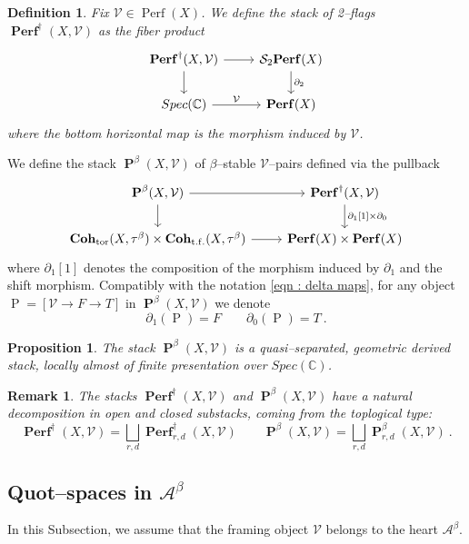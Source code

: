 \documentclass[11pt]{article}
\newtheorem{definition}{Definition}
\newtheorem{proposition}[theorem]{Proposition}
\newtheorem{remark}[theorem]{Remark}
\newcommand{\BC}{\mathbb{C}}
\newcommand{\segal}{\mathcal{S}}
\newcommand{\abeta}{\mathcal{A}^{\beta}}
\newcommand{\abetatorstack}{\boldsymbol{\operatorname{Coh}}_{\operatorname{tor}}(X,\tau^{\beta})}
\newcommand{\abetatfstack}{\boldsymbol{\operatorname{Coh}}_{\operatorname{t.f.}}(X,\tau^{\beta})}
\newcommand{\perf}{\operatorname{Perf}(X)}
\newcommand{\perfstack}{\boldsymbol{\operatorname{Perf}}(X)}
\newcommand{\framing}{\mathcal{V}}
\newcommand{\pairs}{\boldsymbol{\operatorname{P}}^{\beta}(X,\mathcal{V})}
\newcommand{\flags}{\boldsymbol{\operatorname{Perf}}^{\dagger}(X,\mathcal{V})}
\begin{document}
\begin{definition}\label{def : perf}
    Fix $\framing \in \perf$. We define the\textit{ stack of 2--flags} $\flags$ as the fiber product
    \[\begin{tikzcd}
	\flags & {\segal_2\perfstack} \\
	{Spec(\BC)} & \perfstack
	\arrow[from=1-1, to=1-2]
	\arrow[from=1-1, to=2-1]
	\arrow["{\partial_2}", from=1-2, to=2-2]
	\arrow["\framing", from=2-1, to=2-2]
\end{tikzcd}\]
where the bottom horizontal map is the morphism induced by $\framing$. 
\end{definition}
\noindent We define the stack $\pairs$ of $\beta$--stable $\framing$--pairs defined via the pullback
  \begin{equation}\label{eqn : def of stack of stable pairs}\begin{tikzcd}
	\pairs & \flags \\
	{\abetatorstack \times \abetatfstack} & {\perfstack \times \perfstack}
	\arrow[from=1-1, to=1-2]
	\arrow[from=1-1, to=2-1]
	\arrow["{\partial_1[1]\times\partial_0}", from=1-2, to=2-2]
	\arrow[from=2-1, to=2-2]
\end{tikzcd}\end{equation}
  where $\partial_1[1]$ denotes the composition of the morphism induced by $\partial_1$ and the shift morphism. Compatibly with the notation \eqref{eqn : delta maps}, for any object $\operatorname{P}= [\framing \rightarrow F \rightarrow T]$ in $\pairs$ we denote
  \[
        \partial_1(\operatorname{P}) = F \qquad \partial_0(\operatorname{P}) = T\ .
  \]


  
  \begin{proposition}
      The stack $\pairs$ is a quasi--separated, geometric derived stack, locally almost of finite presentation over ${Spec}(\BC)$.
  \end{proposition}

  \begin{remark}\label{rmk : topological type of pairs}
      The stacks $\flags$ and $\pairs$ have a natural decomposition in open and closed substacks, coming from the toplogical type:
      \[
        \flags = \bigsqcup_{r,d}\boldsymbol{\operatorname{Perf}}^{\dagger}_{r,d}(X,\framing) \qquad \pairs = \bigsqcup_{r,d}\boldsymbol{\operatorname{P}}^{\beta}_{r,d}(X,\framing) \ .
      \]
  \end{remark}

\subsection{Quot--spaces in $\abeta$ }\label{subsec : Quotspaces}
\noindent In this Subsection, we assume that the framing object $\framing$ belongs to the heart $\abeta$.
\end{document}

